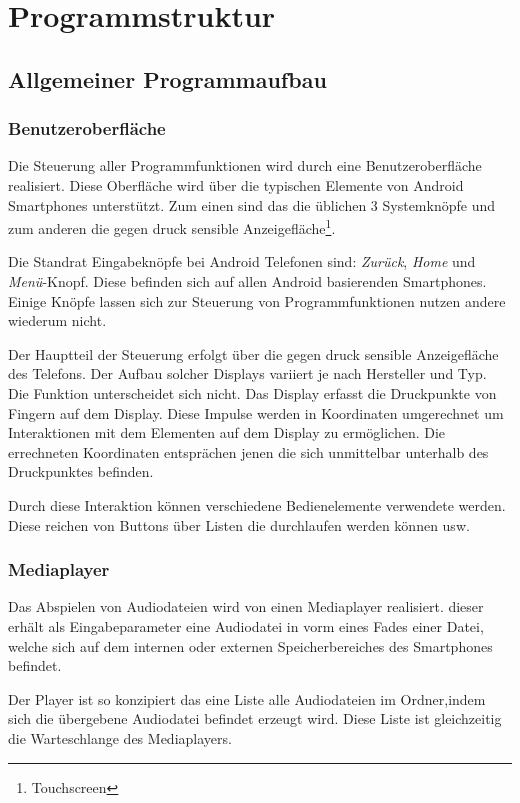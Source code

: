 \section{Programmstruktur}
\subsection{Allgemeiner Programmaufbau}
\subsubsection{Benutzeroberfläche}
Die Steuerung aller Programmfunktionen wird durch eine Benutzeroberfläche realisiert. Diese Oberfläche wird über die typischen Elemente von Android Smartphones unterstützt. Zum einen sind das die üblichen 3 Systemknöpfe und zum anderen die gegen druck sensible Anzeigefläche\footnote{Touchscreen}.

Die Standrat Eingabeknöpfe bei Android Telefonen sind: \textit{Zurück}, \textit{Home} und \textit{Menü}-Knopf. Diese befinden sich auf allen Android basierenden Smartphones. Einige Knöpfe lassen sich zur Steuerung von Programmfunktionen nutzen andere wiederum nicht.

Der Hauptteil der Steuerung erfolgt über die gegen druck sensible Anzeigefläche des Telefons. Der Aufbau solcher Displays variiert je nach Hersteller und Typ. Die Funktion unterscheidet sich nicht. Das Display erfasst die Druckpunkte von Fingern auf dem Display. Diese Impulse werden in Koordinaten umgerechnet um Interaktionen mit dem Elementen auf dem Display zu ermöglichen. Die errechneten Koordinaten entsprächen jenen die sich unmittelbar unterhalb des Druckpunktes befinden.

Durch diese Interaktion können verschiedene Bedienelemente verwendete werden. Diese reichen von Buttons über Listen die durchlaufen werden können usw.

\subsubsection{Mediaplayer}
Das Abspielen von Audiodateien wird von einen Mediaplayer realisiert. dieser erhält als Eingabeparameter eine Audiodatei in vorm eines Fades einer Datei, welche sich auf dem internen oder externen Speicherbereiches des Smartphones befindet. 

Der Player ist so konzipiert das eine Liste alle Audiodateien im Ordner,indem sich die übergebene Audiodatei befindet erzeugt wird. Diese Liste ist gleichzeitig die Warteschlange des Mediaplayers.

